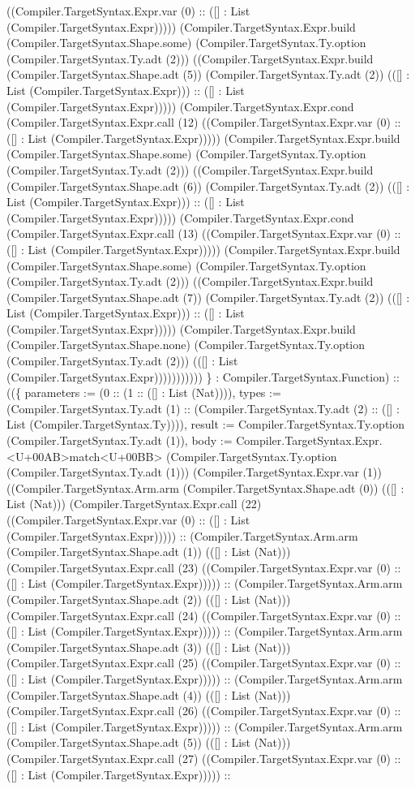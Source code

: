 \documentclass[11pt]{article}
\begin{document}
((Compiler.TargetSyntax.Expr.var (0) :: ([] : List (Compiler.TargetSyntax.Expr))))) (Compiler.TargetSyntax.Expr.build (Compiler.TargetSyntax.Shape.some) (Compiler.TargetSyntax.Ty.option (Compiler.TargetSyntax.Ty.adt (2))) ((Compiler.TargetSyntax.Expr.build (Compiler.TargetSyntax.Shape.adt (5)) (Compiler.TargetSyntax.Ty.adt (2)) (([] : List (Compiler.TargetSyntax.Expr))) :: ([] : List (Compiler.TargetSyntax.Expr))))) (Compiler.TargetSyntax.Expr.cond (Compiler.TargetSyntax.Expr.call (12) ((Compiler.TargetSyntax.Expr.var (0) :: ([] : List (Compiler.TargetSyntax.Expr))))) (Compiler.TargetSyntax.Expr.build (Compiler.TargetSyntax.Shape.some) (Compiler.TargetSyntax.Ty.option (Compiler.TargetSyntax.Ty.adt (2))) ((Compiler.TargetSyntax.Expr.build (Compiler.TargetSyntax.Shape.adt (6)) (Compiler.TargetSyntax.Ty.adt (2)) (([] : List (Compiler.TargetSyntax.Expr))) :: ([] : List (Compiler.TargetSyntax.Expr))))) (Compiler.TargetSyntax.Expr.cond (Compiler.TargetSyntax.Expr.call (13) ((Compiler.TargetSyntax.Expr.var (0) :: ([] : List (Compiler.TargetSyntax.Expr))))) (Compiler.TargetSyntax.Expr.build (Compiler.TargetSyntax.Shape.some) (Compiler.TargetSyntax.Ty.option (Compiler.TargetSyntax.Ty.adt (2))) ((Compiler.TargetSyntax.Expr.build (Compiler.TargetSyntax.Shape.adt (7)) (Compiler.TargetSyntax.Ty.adt (2)) (([] : List (Compiler.TargetSyntax.Expr))) :: ([] : List (Compiler.TargetSyntax.Expr))))) (Compiler.TargetSyntax.Expr.build (Compiler.TargetSyntax.Shape.none) (Compiler.TargetSyntax.Ty.option (Compiler.TargetSyntax.Ty.adt (2))) (([] : List (Compiler.TargetSyntax.Expr))))))))))) \} : Compiler.TargetSyntax.Function) :: ((\{ parameters := (0 :: (1 :: ([] : List (Nat)))), types := (Compiler.TargetSyntax.Ty.adt (1) :: (Compiler.TargetSyntax.Ty.adt (2) :: ([] : List (Compiler.TargetSyntax.Ty)))), result := Compiler.TargetSyntax.Ty.option (Compiler.TargetSyntax.Ty.adt (1)), body := Compiler.TargetSyntax.Expr.<U+00AB>match<U+00BB> (Compiler.TargetSyntax.Ty.option (Compiler.TargetSyntax.Ty.adt (1))) (Compiler.TargetSyntax.Expr.var (1)) ((Compiler.TargetSyntax.Arm.arm (Compiler.TargetSyntax.Shape.adt (0)) (([] : List (Nat))) (Compiler.TargetSyntax.Expr.call (22) ((Compiler.TargetSyntax.Expr.var (0) :: ([] : List (Compiler.TargetSyntax.Expr))))) :: (Compiler.TargetSyntax.Arm.arm (Compiler.TargetSyntax.Shape.adt (1)) (([] : List (Nat))) (Compiler.TargetSyntax.Expr.call (23) ((Compiler.TargetSyntax.Expr.var (0) :: ([] : List (Compiler.TargetSyntax.Expr))))) :: (Compiler.TargetSyntax.Arm.arm (Compiler.TargetSyntax.Shape.adt (2)) (([] : List (Nat))) (Compiler.TargetSyntax.Expr.call (24) ((Compiler.TargetSyntax.Expr.var (0) :: ([] : List (Compiler.TargetSyntax.Expr))))) :: (Compiler.TargetSyntax.Arm.arm (Compiler.TargetSyntax.Shape.adt (3)) (([] : List (Nat))) (Compiler.TargetSyntax.Expr.call (25) ((Compiler.TargetSyntax.Expr.var (0) :: ([] : List (Compiler.TargetSyntax.Expr))))) :: (Compiler.TargetSyntax.Arm.arm (Compiler.TargetSyntax.Shape.adt (4)) (([] : List (Nat))) (Compiler.TargetSyntax.Expr.call (26) ((Compiler.TargetSyntax.Expr.var (0) :: ([] : List (Compiler.TargetSyntax.Expr))))) :: (Compiler.TargetSyntax.Arm.arm (Compiler.TargetSyntax.Shape.adt (5)) (([] : List (Nat))) (Compiler.TargetSyntax.Expr.call (27) ((Compiler.TargetSyntax.Expr.var (0) :: ([] : List (Compiler.TargetSyntax.Expr))))) :: 
\end{document}
